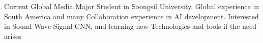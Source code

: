 

\begin{cvparagraph}

Current Global Media Major Student in Soongsil University. Global experience in South America and many Collaboration experience in AI development. Interested in Sound Wave Signal CNN, and learning new Technologies and tools if the need arises
\end{cvparagraph}
